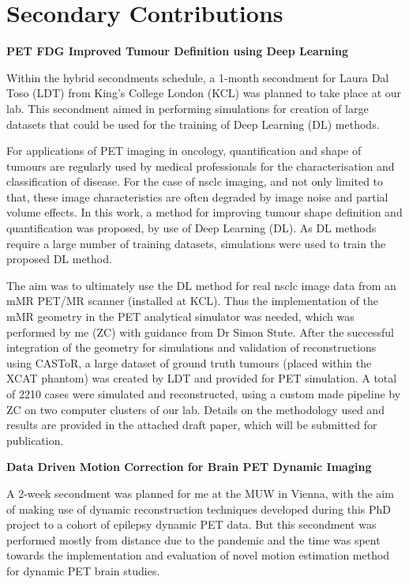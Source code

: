 \chapter*{Secondary Contributions}
\label{Secondary_Contributions}

\textbf{PET FDG Improved Tumour Definition using Deep Learning}

Within the \gls{hybrid} secondments schedule, a 1-month secondment for Laura Dal Toso (LDT) from King's College London (KCL) was planned to take place at our lab. This secondment aimed in performing simulations for creation of large datasets that could be used for the training of Deep Learning (DL) methods.

For applications of PET imaging in oncology, quantification and shape of tumours are regularly used by medical professionals for the characterisation and classification of disease. For the case of \gls{nsclc} imaging, and not only limited to that, these image characteristics are often degraded by image noise and partial volume effects.
In this work, a method for improving tumour shape definition and quantification was proposed, by use of Deep Learning (DL). As DL methods require a large number of training datasets, simulations were used to train the proposed DL method. 

The aim was to ultimately use the DL method for real \gls{nsclc} image data from an mMR PET/MR scanner (installed at KCL). Thus the implementation of the mMR geometry in the PET analytical simulator was needed, which was performed by me (ZC) with guidance from Dr Simon Stute. After the successful integration of the geometry for simulations and validation of reconstructions using CASToR, a large dataset of ground truth tumours (placed within the XCAT phantom) was created by LDT and provided for PET simulation. A total of 2210 cases were simulated and reconstructed, using a custom made pipeline by ZC on two computer clusters of our lab.
Details on the methodology used and results are provided in the attached draft paper, which will be submitted for publication.

\textbf{Data Driven Motion Correction for Brain PET Dynamic Imaging}

A 2-week secondment was planned for me at the MUW in Vienna, with the aim of making use of dynamic reconstruction techniques developed during this PhD project to a cohort of epilepsy dynamic PET data. But this secondment was performed mostly from distance due to the pandemic and the time was spent towards the implementation and evaluation of novel motion estimation method for dynamic PET brain studies. 


